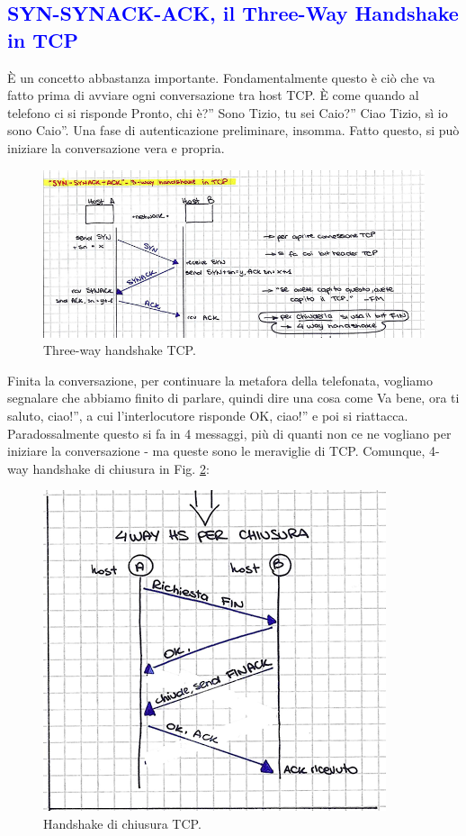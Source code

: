 \subsection*{\textcolor{blue}{SYN-SYNACK-ACK, il Three-Way Handshake in TCP}}
\noindent {}È un concetto abbastanza importante. Fondamentalmente questo è ciò che va fatto prima di avviare ogni conversazione tra host TCP. È come quando al telefono ci si risponde \openapex Pronto, chi è?'' \openapex Sono Tizio, tu sei Caio?'' \openapex Ciao Tizio, sì io sono Caio''. Una fase di autenticazione preliminare, insomma. Fatto questo, si può iniziare la conversazione vera e propria.\\

\begin{figure} [h]
    \centering
    \includegraphics[width=1\linewidth]{Figures/03/tcp-3whs.png}
    \caption{Three-way handshake TCP.}
    \label{fig:3whsTCP}
\end{figure}

\noindent Finita la conversazione, per continuare la metafora della telefonata, vogliamo segnalare che abbiamo finito di parlare, quindi dire una cosa come \noindent Va bene, ora ti saluto, ciao!'', a cui l'interlocutore risponde \noindent OK, ciao!'' e poi si riattacca. Paradossalmente questo si fa in 4 messaggi, più di quanti non ce ne vogliano per iniziare la conversazione - ma queste sono le meraviglie di TCP. Comunque, 4-way handshake di chiusura in Fig. \ref{fig:4whsTCP}:

\begin{figure} [h]
    \centering
    \includegraphics[width=0.5\linewidth]{Figures/03/4whstcp.png}
    \caption{Handshake di chiusura TCP.}
    \label{fig:4whsTCP}
\end{figure}

